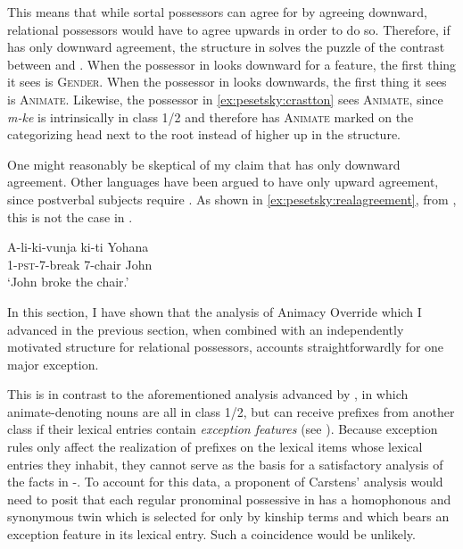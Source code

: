 \documentclass[output=paper
,newtxmath
,modfonts
,nonflat]{langsci/langscibook}
\begin{document}
This means that while sortal possessors can agree for  by agreeing downward, relational possessors would have to agree upwards in order to do so.  Therefore, if  has only downward agreement, the structure in  solves the puzzle of the contrast between  and . When the possessor in  looks downward for a  feature, the first thing it sees is \textsc{Gender}.  When the possessor in  looks downwards, the first thing it sees is \textsc{Animate}.  Likewise, the possessor in \ref{ex:pesetsky:crastton} sees \textsc{Animate}, since \textit{m-ke} is intrinsically in class 1/2 and therefore has \textsc{Animate} marked on the categorizing head next to the root instead of higher up in the structure. 

One might reasonably be skeptical of my claim that  has only downward agreement.  Other  languages have been argued to have only upward agreement, since postverbal subjects require . As shown in \ref{ex:pesetsky:realagreement}, from \citet{taniguchi13}, this is not the case in .

\ea\label{ex:pesetsky:realagreement}
{ \gll A-li-ki-vunja ki-ti Yohana \\
 \textsc{1}-\textsc{pst}-\textsc{7}-break \textsc{7}-chair John 
 \\ \glt `John broke the chair.' } \z 


In this section, I have shown that the analysis of Animacy Override which I advanced in the previous section, when combined with an independently motivated structure for relational possessors, accounts straightforwardly for one major exception.  

This is in contrast to the aforementioned analysis advanced by \citet{carstens91}, in which animate-denoting nouns are all in class 1/2, but can receive prefixes from another class if their lexical entries contain \textit{exception features} (see ).  Because exception rules only affect the realization of prefixes on the lexical items whose lexical entries they inhabit, they cannot serve as the basis for a satisfactory analysis of the facts in -.  To account for this data, a proponent of Carstens' analysis would need to posit that each regular pronominal possessive in  has a homophonous and synonymous twin which is selected for only by kinship terms and which bears an exception feature in its lexical entry.  Such a coincidence would be unlikely. 
\end{document}
